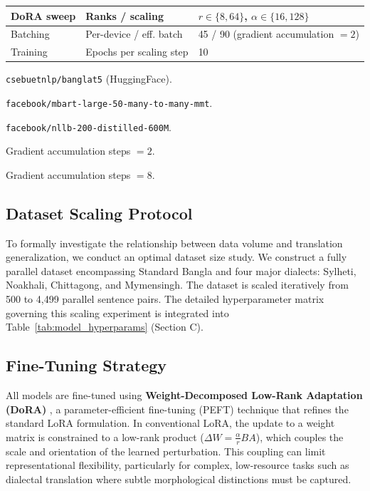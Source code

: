 \documentclass[12pt,a4paper]{article}
\begin{document}
\begin{table}[!htbp]
\begin{threeparttable}
\begin{tabular}{|l|l|c|c|c|}
\hline
DoRA sweep    & Ranks / scaling        & \multicolumn{3}{l|}{$r\in\{8,64\}$, $\alpha\in\{16,128\}$}               \\
\hline
Batching      & Per-device / eff. batch & \multicolumn{3}{l|}{45 / 90 (gradient accumulation $= 2$)}               \\
\hline
Training      & Epochs per scaling step & \multicolumn{3}{l|}{10}                                                   \\
\hline
\end{tabular}
\begin{tablenotes}[flushleft]
\scriptsize
\item[a] \texttt{csebuetnlp/banglat5} (HuggingFace).
\item[b] \texttt{facebook/mbart-large-50-many-to-many-mmt}.
\item[c] \texttt{facebook/nllb-200-distilled-600M}.
\item[d] Gradient accumulation steps $= 2$.
\item[e] Gradient accumulation steps $= 8$.
\end{tablenotes}
\end{threeparttable}
\end{table}



\subsection{Dataset Scaling Protocol}
To formally investigate the relationship between data volume and translation generalization, we conduct an optimal dataset size study. We construct a fully parallel dataset encompassing Standard Bangla and four major dialects: Sylheti, Noakhali, Chittagong, and Mymensingh. The dataset is scaled iteratively from 500 to 4,499 parallel sentence pairs. The detailed hyperparameter matrix governing this scaling experiment is integrated into Table~\ref{tab:model_hyperparams} (Section C).

\subsection{Fine-Tuning Strategy}
All models are fine-tuned using \textbf{Weight-Decomposed Low-Rank Adaptation (DoRA)} \cite{liu2024dora}, a parameter-efficient fine-tuning (PEFT) technique that refines the standard LoRA \cite{hu2021lora} formulation. In conventional LoRA, the update to a weight matrix is constrained to a low-rank product ($\Delta W = \frac{\alpha}{r} B A$), which couples the scale and orientation of the learned perturbation. This coupling can limit representational flexibility, particularly for complex, low-resource tasks such as dialectal translation where subtle morphological distinctions must be captured.
\end{document}
